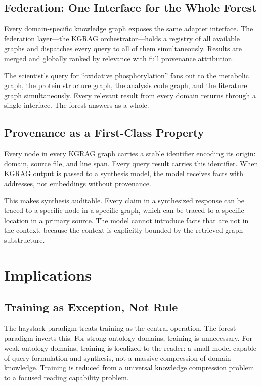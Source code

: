 \documentclass{article}
\begin{document}
\subsection{Federation: One Interface for the Whole Forest}

Every domain-specific knowledge graph exposes the same adapter interface.  The
federation layer---the KGRAG orchestrator---holds a registry of all available
graphs and dispatches every query to all of them simultaneously.  Results are
merged and globally ranked by relevance with full provenance attribution.

The scientist's query for ``oxidative phosphorylation'' fans out to the metabolic
graph, the protein structure graph, the analysis code graph, and the literature
graph simultaneously.  Every relevant result from every domain returns through a
single interface.  The forest answers as a whole.

\subsection{Provenance as a First-Class Property}

Every node in every KGRAG graph carries a stable identifier encoding its origin:
domain, source file, and line span.  Every query result carries this identifier.
When KGRAG output is passed to a synthesis model, the model receives facts with
addresses, not embeddings without provenance.

This makes synthesis auditable.  Every claim in a synthesized response can be
traced to a specific node in a specific graph, which can be traced to a specific
location in a primary source.  The model cannot introduce facts that are not in
the context, because the context is explicitly bounded by the retrieved graph
substructure.

\section{Implications}

\subsection{Training as Exception, Not Rule}

The haystack paradigm treats training as the central operation.  The forest
paradigm inverts this.  For strong-ontology domains, training is unnecessary.
For weak-ontology domains, training is localized to the reader: a small model
capable of query formulation and synthesis, not a massive compression of domain
knowledge.  Training is reduced from a universal knowledge compression problem to
a focused reading capability problem.
\end{document}
